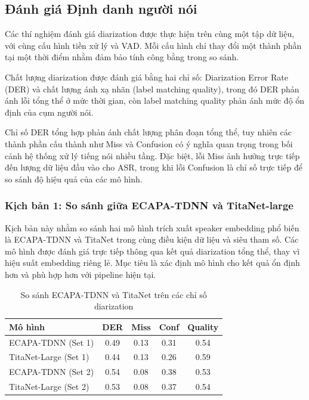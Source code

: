 \subsection{Đánh giá Định danh người nói}
Các thí nghiệm đánh giá diarization được thực hiện trên cùng một tập dữ liệu, với cùng cấu hình tiền xử lý và VAD. Mỗi cấu hình chỉ thay đổi một thành phần tại một thời điểm nhằm đảm bảo tính công bằng trong so sánh.

Chất lượng diarization được đánh giá bằng hai chỉ số: Diarization Error Rate (DER) và chất lượng ánh xạ nhãn (label matching quality), trong đó DER phản ánh lỗi tổng thể ở mức thời gian, còn label matching quality phản ánh mức độ ổn định của cụm người nói.

Chỉ số DER tổng hợp phản ánh chất lượng phân đoạn tổng thể, tuy nhiên các thành phần cấu thành như Miss và Confusion có ý nghĩa quan trọng trong bối cảnh hệ thống xử lý tiếng nói nhiều tầng.
Đặc biệt, lỗi Miss ảnh hưởng trực tiếp đến lượng dữ liệu đầu vào cho ASR, trong khi lỗi Confusion là chỉ số trực tiếp để so sánh độ hiệu quả của các mô hình.

\subsubsection{Kịch bản 1: So sánh giữa ECAPA-TDNN và TitaNet-large}
Kịch bản này nhằm so sánh hai mô hình trích xuất speaker embedding phổ biến là ECAPA-TDNN và TitaNet trong cùng điều kiện dữ liệu và siêu tham số. Các mô hình được đánh giá trực tiếp thông qua kết quả diarization tổng thể, thay vì hiệu suất embedding riêng lẻ. Mục tiêu là xác định mô hình cho kết quả ổn định hơn và phù hợp hơn với pipeline hiện tại.

\begin{table}[h]
\centering
\caption{So sánh ECAPA-TDNN và TitaNet trên các chỉ số diarization}
\begin{tabular}{lcccc}
\hline
\textbf{Mô hình} & \textbf{DER} & \textbf{Miss} & \textbf{Conf} & \textbf{Quality} \\
\hline
ECAPA-TDNN (Set 1) & 0.49 & 0.13 & 0.31 & 0.54 \\
TitaNet-Large (Set 1) & 0.44 & 0.13 & 0.26 & 0.59 \\
ECAPA-TDNN (Set 2) & 0.54 & 0.08 & 0.38 & 0.53 \\
TitaNet-Large (Set 2) & 0.53 & 0.08 & 0.37 & 0.54 \\
\hline
\end{tabular}
\end{table}

